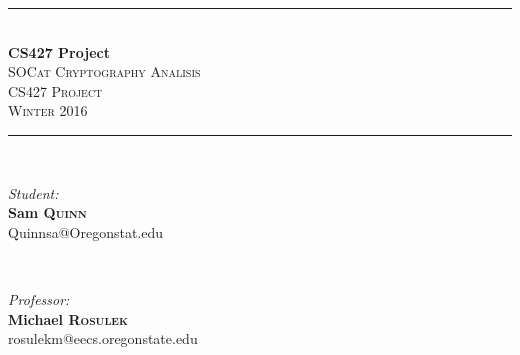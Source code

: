 \documentclass[letterpaper,11pt,notitlepage,fleqn]{article}
\begin{document}
\begin{titlepage}
\vspace*{\fill}

\newcommand{\HRule}{\rule{\linewidth}{0.5mm}} %

\center %


\HRule \\[0.4cm]
{ \huge \bfseries CS427 Project}\\[0.4cm] %


\textsc{\LARGE SOCat Cryptography Analisis}\\[0.5cm] %
\textsc{\Large CS427 Project}\\[0.5cm] %
\textsc{\large Winter 2016}\\[0.5cm] %


\HRule \\[1.5cm]

\begin{minipage}{0.4\textwidth}
\begin{flushleft} \large
\emph{Student:}\\
        \textbf{Sam \textsc{Quinn}} \\ %
        {\small Quinnsa@Oregonstat.edu}
        \end{flushleft}
        \end{minipage}
        ~
        \begin{minipage}{0.4\textwidth}
        \begin{flushright} \large
        \emph{Professor:} \\
            \textbf{Michael \textsc{Rosulek}} \\ %
            {\small rosulekm@eecs.oregonstate.edu}
            \end{flushright}
            \end{minipage}\\[3cm]


\end{titlepage}
\end{document}
